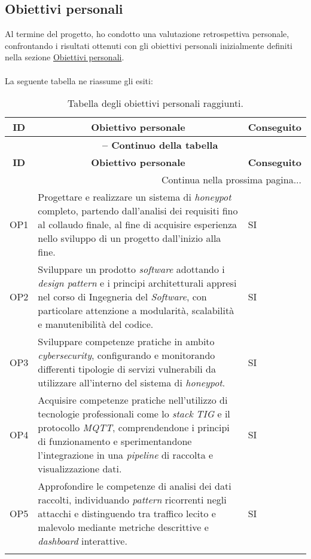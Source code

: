 \subsection*{Obiettivi personali}
Al termine del progetto, ho condotto una valutazione retrospettiva personale, confrontando i risultati ottenuti con gli obiettivi personali inizialmente definiti nella sezione \hyperref[tab:obiettivi-personali]{Obiettivi personali}.\\\\
La seguente tabella ne riassume gli esiti:
\begin{center}
\begin{longtable}{|p{}|p{}|p{}|}
\hline
\multicolumn{1}{|c|}{\textbf{ID}} & \multicolumn{1}{c|}{\textbf{Obiettivo personale}} & \multicolumn{1}{c|}{\textbf{Conseguito}} \\ 
\hline 
\endfirsthead
\multicolumn{3}{c}{{\bfseries \tablename\ \thetable{} -- Continuo della tabella}}\\
\hline
\multicolumn{1}{|c|}{\textbf{ID}} & \multicolumn{1}{c|}{\textbf{Obiettivo personale}} & \multicolumn{1}{c|}{\textbf{Conseguito}} \\ \hline 
\endhead
\hline
\multicolumn{3}{|r|}{{Continua nella prossima pagina...}}\\
\hline
\endfoot
\endlastfoot 

OP1 & Progettare e realizzare un sistema di \textit{honeypot} completo, partendo dall'analisi dei requisiti fino al collaudo finale, al fine di acquisire esperienza nello sviluppo di un progetto dall'inizio alla fine. & SI \\ \hline
OP2 & Sviluppare un prodotto \textit{software} adottando i \textit{design pattern} e i principi architetturali appresi nel corso di Ingegneria del \textit{Software}, con particolare attenzione a modularità, scalabilità e manutenibilità del codice. & SI \\ \hline
OP3 & Sviluppare competenze pratiche in ambito \textit{cybersecurity}, configurando e monitorando differenti tipologie di servizi vulnerabili da utilizzare all'interno del sistema di \textit{honeypot}. & SI \\ \hline
OP4 & Acquisire competenze pratiche nell'utilizzo di tecnologie professionali come lo \textit{stack} \textit{TIG} e il protocollo \textit{MQTT}, comprendendone i principi di funzionamento e sperimentandone l'integrazione in una \textit{pipeline} di raccolta e visualizzazione dati. & SI \\ \hline
OP5 & Approfondire le competenze di analisi dei dati raccolti, individuando \textit{pattern} ricorrenti negli attacchi e distinguendo tra traffico lecito e malevolo mediante metriche descrittive e \textit{dashboard} interattive. & SI \\ \hline

\caption{Tabella degli obiettivi personali raggiunti.}
\label{tab:obiettivi-personali-raggiunti}
\end{longtable}
\end{center}
